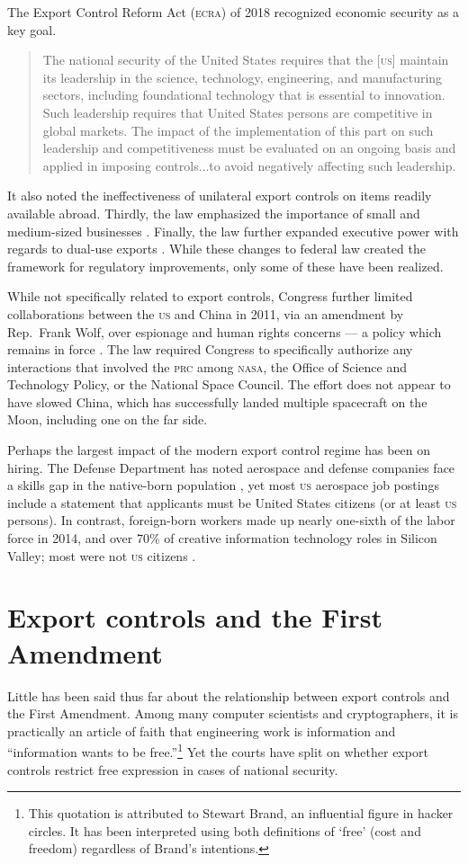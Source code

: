 \documentclass[12pt]{olfmemo}
\begin{document}
The Export Control Reform Act (\textsc{ecra}) of 2018 recognized economic security as a key goal.
\begin{quote}
The national security of the United States requires that the [\textsc{us}] maintain its leadership in the science, technology, engineering, and manufacturing sectors, including foundational technology that is essential to innovation. Such leadership requires that United States persons are competitive in global markets. The impact of the implementation of this part on such leadership and competitiveness must be evaluated on an ongoing basis and applied in imposing controls...to avoid negatively affecting such leadership. \citep[Section 1752(3)]{ECRA2018}
\end{quote} 
It also noted the ineffectiveness of unilateral export controls on items readily available abroad. Thirdly, the law emphasized the importance of small and medium-sized businesses \citep{ECRA2018}. Finally, the law further expanded executive power with regards to dual-use exports \citep{Fergusson2020}. While these changes to federal law created the framework for regulatory improvements, only some of these have been realized.

While not specifically related to export controls, Congress further limited collaborations between the \textsc{us} and China in 2011, via an amendment by Rep.~Frank Wolf, over espionage \citep{Pentland2011} and human rights concerns --- a policy which remains in force \citep{Foust2019}. The law required Congress to specifically authorize any interactions that involved the \textsc{prc} among \textsc{nasa}, the Office of Science and Technology Policy, or the National Space Council. The effort does not appear to have slowed China, which has successfully landed multiple spacecraft on the Moon, including one on the far side.

Perhaps the largest impact of the modern export control regime has been on hiring. The Defense Department has noted aerospace and defense companies face a skills gap in the native-born population \citep{DoD2018}, yet most \textsc{us} aerospace job postings include a statement that applicants must be United States citizens (or at least \textsc{us} persons). In contrast, foreign-born workers made up nearly one-sixth of the labor force in 2014, and over 70\% of creative information technology roles in Silicon Valley; most were not \textsc{us} citizens \citep{Otoiu2017}.

\section{Export controls and the First Amendment}
Little has been said thus far about the relationship between export controls and the First Amendment. Among many computer scientists and cryptographers, it is practically an article of faith that engineering work is information and ``information wants to be free.''\footnote{This quotation is attributed to Stewart Brand, an influential figure in hacker circles. It has been interpreted using both definitions of `free' (cost and freedom) regardless of Brand's intentions.} Yet the courts have split on whether export controls restrict free expression in cases of national security.
\end{document}
